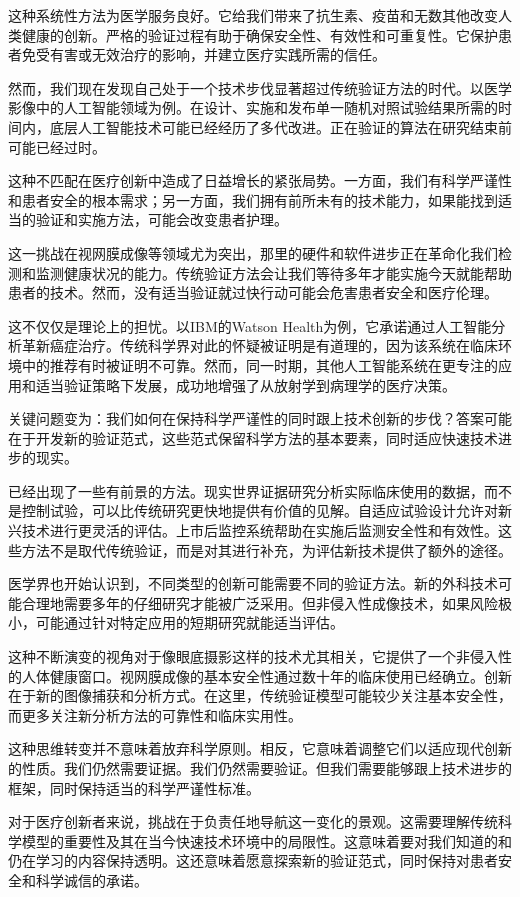 \documentclass[
  Letterpaper,
]{scrbook}
\begin{document}
这种系统性方法为医学服务良好。它给我们带来了抗生素、疫苗和无数其他改变人类健康的创新。严格的验证过程有助于确保安全性、有效性和可重复性。它保护患者免受有害或无效治疗的影响，并建立医疗实践所需的信任。

然而，我们现在发现自己处于一个技术步伐显著超过传统验证方法的时代。以医学影像中的人工智能领域为例。在设计、实施和发布单一随机对照试验结果所需的时间内，底层人工智能技术可能已经经历了多代改进。正在验证的算法在研究结束前可能已经过时。

这种不匹配在医疗创新中造成了日益增长的紧张局势。一方面，我们有科学严谨性和患者安全的根本需求；另一方面，我们拥有前所未有的技术能力，如果能找到适当的验证和实施方法，可能会改变患者护理。

这一挑战在视网膜成像等领域尤为突出，那里的硬件和软件进步正在革命化我们检测和监测健康状况的能力。传统验证方法会让我们等待多年才能实施今天就能帮助患者的技术。然而，没有适当验证就过快行动可能会危害患者安全和医疗伦理。

这不仅仅是理论上的担忧。以IBM的Watson
Health为例，它承诺通过人工智能分析革新癌症治疗。传统科学界对此的怀疑被证明是有道理的，因为该系统在临床环境中的推荐有时被证明不可靠。然而，同一时期，其他人工智能系统在更专注的应用和适当验证策略下发展，成功地增强了从放射学到病理学的医疗决策。

关键问题变为：我们如何在保持科学严谨性的同时跟上技术创新的步伐？答案可能在于开发新的验证范式，这些范式保留科学方法的基本要素，同时适应快速技术进步的现实。

已经出现了一些有前景的方法。现实世界证据研究分析实际临床使用的数据，而不是控制试验，可以比传统研究更快地提供有价值的见解。自适应试验设计允许对新兴技术进行更灵活的评估。上市后监控系统帮助在实施后监测安全性和有效性。这些方法不是取代传统验证，而是对其进行补充，为评估新技术提供了额外的途径。

医学界也开始认识到，不同类型的创新可能需要不同的验证方法。新的外科技术可能合理地需要多年的仔细研究才能被广泛采用。但非侵入性成像技术，如果风险极小，可能通过针对特定应用的短期研究就能适当评估。

这种不断演变的视角对于像眼底摄影这样的技术尤其相关，它提供了一个非侵入性的人体健康窗口。视网膜成像的基本安全性通过数十年的临床使用已经确立。创新在于新的图像捕获和分析方式。在这里，传统验证模型可能较少关注基本安全性，而更多关注新分析方法的可靠性和临床实用性。

这种思维转变并不意味着放弃科学原则。相反，它意味着调整它们以适应现代创新的性质。我们仍然需要证据。我们仍然需要验证。但我们需要能够跟上技术进步的框架，同时保持适当的科学严谨性标准。

对于医疗创新者来说，挑战在于负责任地导航这一变化的景观。这需要理解传统科学模型的重要性及其在当今快速技术环境中的局限性。这意味着要对我们知道的和仍在学习的内容保持透明。这还意味着愿意探索新的验证范式，同时保持对患者安全和科学诚信的承诺。
\end{document}
